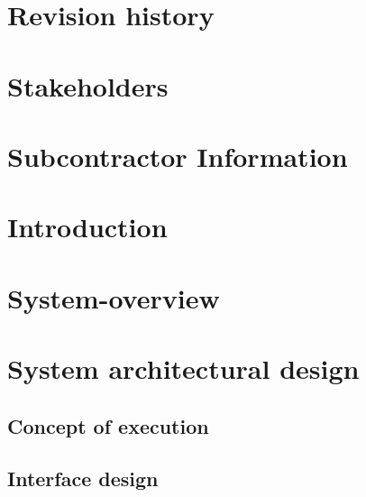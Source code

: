 \documentclass[a4paper, oneside, 11pt]{article}
\begin{document}

\addtolength{\topmargin}{-2cm}
\tableofcontents

\noindent
\section{Revision history}

\section{Stakeholders}

\section{Subcontractor Information}

%
\section{Introduction}

\section{System-overview}

\section{System architectural design}

%
\subsection{Concept of execution}

\newpage
\subsection{Interface design}

\end{document}
